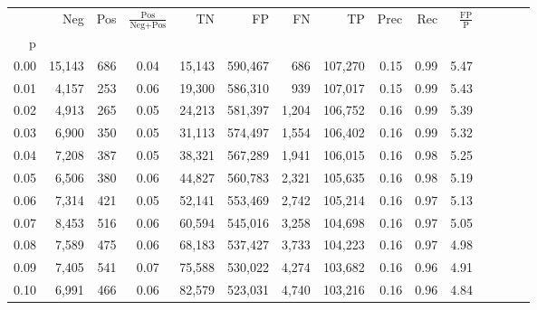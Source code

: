 \begin{tabular}{rrrcrrrrrrrrrrr}
\toprule
{} &     Neg &    Pos & $\frac{\text{Pos}}{\text{Neg}+\text{Pos}}$ &       TN &       FP &       FN &       TP &  Prec &   Rec & $\frac{\text{FP}}{\text{P}}$ \\
p    &         &        &                                            &          &          &          &          &       &       &                              \\
\midrule
0.00 &  15,143 &    686 &                                       0.04 &   15,143 &  590,467 &      686 &  107,270 &  0.15 &  0.99 &                         5.47 \\
0.01 &   4,157 &    253 &                                       0.06 &   19,300 &  586,310 &      939 &  107,017 &  0.15 &  0.99 &                         5.43 \\
0.02 &   4,913 &    265 &                                       0.05 &   24,213 &  581,397 &    1,204 &  106,752 &  0.16 &  0.99 &                         5.39 \\
0.03 &   6,900 &    350 &                                       0.05 &   31,113 &  574,497 &    1,554 &  106,402 &  0.16 &  0.99 &                         5.32 \\
0.04 &   7,208 &    387 &                                       0.05 &   38,321 &  567,289 &    1,941 &  106,015 &  0.16 &  0.98 &                         5.25 \\
0.05 &   6,506 &    380 &                                       0.06 &   44,827 &  560,783 &    2,321 &  105,635 &  0.16 &  0.98 &                         5.19 \\
0.06 &   7,314 &    421 &                                       0.05 &   52,141 &  553,469 &    2,742 &  105,214 &  0.16 &  0.97 &                         5.13 \\
0.07 &   8,453 &    516 &                                       0.06 &   60,594 &  545,016 &    3,258 &  104,698 &  0.16 &  0.97 &                         5.05 \\
0.08 &   7,589 &    475 &                                       0.06 &   68,183 &  537,427 &    3,733 &  104,223 &  0.16 &  0.97 &                         4.98 \\
0.09 &   7,405 &    541 &                                       0.07 &   75,588 &  530,022 &    4,274 &  103,682 &  0.16 &  0.96 &                         4.91 \\
0.10 &   6,991 &    466 &                                       0.06 &   82,579 &  523,031 &    4,740 &  103,216 &  0.16 &  0.96 &                         4.84 \\

\end{tabular}
